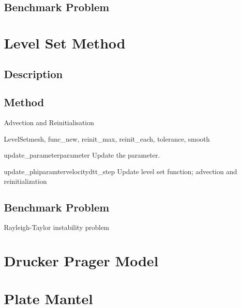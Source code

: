 \subsection{Benchmark Problem}


\section{Level Set Method}

\subsection{Description}

\subsection{Method}

Advection and Reinitialisation

\begin{classdesc}{LevelSet}{mesh, func\_new, reinit\_max, reinit\_each, tolerance, smooth}
\end{classdesc}



\begin{methoddesc}[LevelSet]{update\_parameter}{parameter}
Update the parameter.
\end{methoddesc}

\begin{methoddesc}[LevelSet]{update\_phi}{paramter}{velocity}{dt}{t\_step}
Update level set function; advection and reinitialization
\end{methoddesc}

\subsection{Benchmark Problem}

Rayleigh-Taylor instability problem


\section{Drucker Prager Model}

\section{Plate Mantel}
